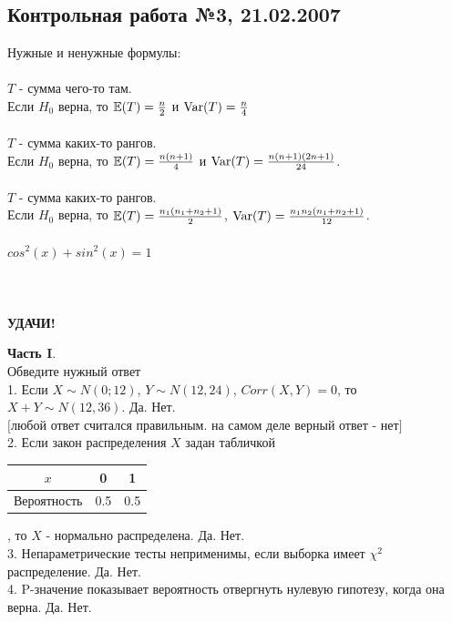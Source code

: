 \documentclass[12pt, a4paper]{article}\usepackage[]{graphicx}\usepackage[]{color}
\begin{document}
	\subsection{Контрольная работа №3, 21.02.2007}

	Нужные и ненужные формулы: \\ \\
	$T$ - сумма чего-то там. \\
	Если $H_{0}$ верна, то $\mathbb{E}(T)=\frac{n}{2}$ и $\operatorname{Var}(T)=\frac{n}{4}$ \\ \\
	$T$ - сумма каких-то рангов. \\
	Если $H_{0}$ верна, то $\mathbb{E}(T)=\frac{n(n+1)}{4}$ и
	$\operatorname{Var}(T)=\frac{n(n+1)(2n+1)}{24}$. \\ \\
	$T$ - сумма каких-то рангов. \\
	Если $H_{0}$ верна, то $\mathbb{E}(T)=\frac{n_{1}(n_{1}+n_{2}+1)}{2}$,
	$\operatorname{Var}(T)=\frac{n_{1}n_{2}(n_{1}+n_{2}+1)}{12}$. \\ \\
	$cos^{2}(x)+sin^{2}(x)=1$ \\ \\ \\ \\


	\textbf{УДАЧИ!}

	\textbf{Часть I}. \\
	Обведите нужный ответ \\

	1. Если $X\sim N(0;12)$, $Y\sim N(12,24)$, $Corr(X,Y)=0$, то
	$X+Y\sim N(12,36)$.
	Да. Нет. \\
	$[$любой ответ считался правильным. на самом деле верный ответ -
	нет$]$ \\

	2. Если закон распределения $X$ задан табличкой

	\begin{tabular}{|c|c|c|}
		\hline
		$x$ & 0 & 1 \\
		\hline
		Вероятность & 0.5 & 0.5 \\
		\hline
	\end{tabular}, то $X$ - нормально распределена. Да. Нет. \\

	3. Непараметрические тесты неприменимы, если выборка имеет
	$\chi^{2}$ распределение. Да. Нет.
	\\

	4. P-значение показывает вероятность отвергнуть нулевую
	гипотезу, когда она верна. Да. Нет. \\
\end{document}
